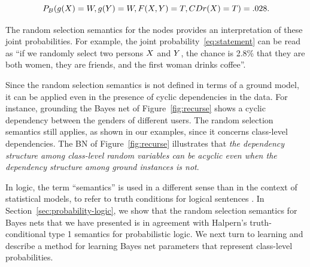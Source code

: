 \documentclass[oribibl]{llncs}
\begin{document}
\begin{equation}\label{eq:statement}
\textstyle P_{\B}(g(\X) = W, g(\Y)=W, F(\X,\Y)=T, CDr(\X)=T) = .028.  %
\end{equation}

The random selection semantics for the nodes provides an interpretation of these joint probabilities. 
For example, 
the joint probability~\eqref{eq:statement} can be read as ``if we randomly select two persons $X$ and $Y$, the chance is 2.8\% that they are both women, they are friends, and the first woman drinks coffee''.  

Since the random selection semantics is not defined in terms of a ground model, it can be applied even in the presence of cyclic dependencies in the data. For instance, grounding the Bayes net of Figure~\ref{fig:recurse} shows a cyclic dependency between the genders of different users. The random selection semantics still applies, as shown in our examples, since it concerns class-level dependencies. The BN of Figure~\ref{fig:recurse} illustrates that {\em the dependency structure among class-level random variables can be acyclic even when the dependency structure among ground instances is not}.

In logic, the term ``semantics'' is used in a different sense than in the context of statistical models, to refer to truth conditions for logical sentences \cite[Ch.7.4.2]{Russell2010}. In Section~\ref{sec:probability-logic}, we show that the random selection semantics for Bayes nets that we have presented is in agreement with Halpern's truth-conditional type 1 semantics for probabilistic logic. We next turn to learning and describe a method for learning Bayes net parameters that represent class-level probabilities. 

\end{document}
